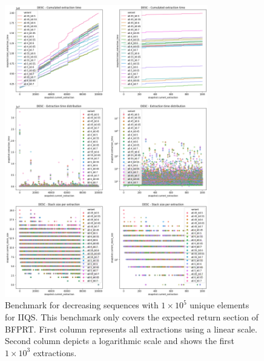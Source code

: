 \begin{figure}[!ht]
    \centering
    \includegraphics[width=0.79\textwidth]{./fragments/04_experimental_execution/images/04_alphabeta_detail_decreasing_inner.png}
    \caption{Benchmark for decreasing sequences with $1\times10^5$ unique elements for IIQS. This benchmark only covers the expected return section of BFPRT. First column represents all extractions using a linear scale. Second column depicts a logarithmic scale and shows the first $1\times10^3$ extractions. }
    \label{FIG:05_ALPHABETA_BENCHMARK_DESC_INNER}
\end{figure}

